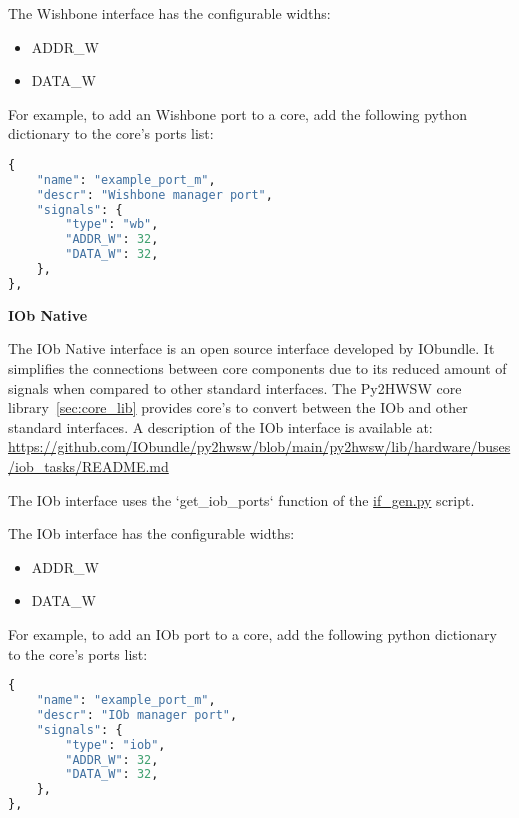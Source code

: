 
The Wishbone interface has the configurable widths:
\begin{itemize}
  \item ADDR\_W
  \item DATA\_W
\end{itemize}

For example, to add an Wishbone port to a core, add the following python dictionary to the core's ports list:
\begin{lstlisting}[language=python]
{
	"name": "example_port_m",
	"descr": "Wishbone manager port",
	"signals": {
		"type": "wb",
		"ADDR_W": 32,
		"DATA_W": 32,
	},
},
\end{lstlisting}


%
%
\clearpage
\large\textbf{IOb Native}

The IOb Native interface is an open source interface developed by IObundle.
It simplifies the connections between core components due to its reduced amount of signals when compared to other standard interfaces.
The Py2HWSW core library~\ref{sec:core_lib} provides core's to convert between the IOb and other standard interfaces.
A description of the IOb interface is available at:
\url{https://github.com/IObundle/py2hwsw/blob/main/py2hwsw/lib/hardware/buses/iob_tasks/README.md}

The IOb interface uses the `get\_iob\_ports` function of the \href{https://github.com/IObundle/py2hwsw/blob/main/py2hwsw/scripts/if_gen.py}{if\_gen.py} script.


The IOb interface has the configurable widths:
\begin{itemize}
  \item ADDR\_W
  \item DATA\_W
\end{itemize}

For example, to add an IOb port to a core, add the following python dictionary to the core's ports list:
\begin{lstlisting}[language=python]
{
	"name": "example_port_m",
	"descr": "IOb manager port",
	"signals": {
		"type": "iob",
		"ADDR_W": 32,
		"DATA_W": 32,
	},
},
\end{lstlisting}


